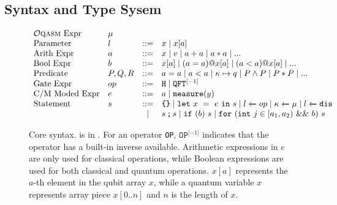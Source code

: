 \subsection {Syntax and Type Sysem}\label{sec:syntax-types}


\begin{figure}[t]
{
  \small
  \[\begin{array}{llcl} 
      \text{\oqasm Expr} & \mu\\
      \text{Parameter} & l & ::= & x \mid x[a] \\
      \text{Arith Expr} & a & ::= & x \mid v \mid a + a \mid a * a \mid ... \\
      \text{Bool Expr} & b & ::= & x[a] \mid (a = a) @ x[a] \mid (a < a) @ x[a] \mid ... \\
      \text{Predicate} & P,Q,R & ::= & a = a \mid a < a \mid \kappa \mapsto q \mid P \wedge P \mid P * P \mid ... \\
      \text{Gate Expr} & op & ::= & \texttt{H} \mid \iqft[\lbrack -1 \rbrack]{}{} \\
      \text{C/M Moded Expr}& e & ::= & a \mid \smea{y} \\
      \text{Statement} & s & ::= & \sskip \mid \sexp{x}{e}{s} \mid  \ssassign{l}{}{op} \mid \ssassign{\kappa}{}{\mu} 
                                 \mid \ssassign{l}{}{\sdis}
                                 \\ & & \mid & \sseq{s}{s} \mid \sifq{b}{s} \mid
                                     \sqwhile{j}{a_1}{a_2}{b}{s}
    \end{array}
  \]
}
  \caption{Core \qafny syntax. \oqasm is in . For an operator \texttt{OP}, $\texttt{OP}^{\lbrack -1 \rbrack}$ indicates that the operator has a built-in inverse available. Arithmetic expressions in $e$ are only used for classical operations, while Boolean expressions are used for both classical and quantum operations. $x[a]$ represents the $a$-th element in the qubit array $x$, while a quantum variable $x$ represents array piece $x[0..n]$ and $n$ is the length of $x$. }
  \label{fig:vqimp}
\end{figure}

